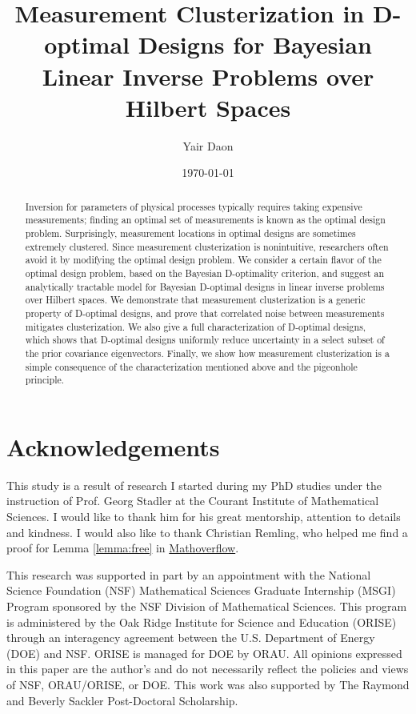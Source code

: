\documentclass{amsart}
\title[Measurement Clusterization in D-optimal Designs]{Measurement
  Clusterization in D-optimal Designs for Bayesian Linear Inverse
  Problems over Hilbert Spaces}
\author{Yair Daon}
\date{\today}
\begin{document}
\begin{abstract}
  Inversion for parameters of physical processes typically requires
  taking expensive measurements; finding an optimal set of
  measurements is known as the optimal design problem. Surprisingly,
  measurement locations in optimal designs are sometimes extremely
  clustered. Since measurement clusterization is nonintuitive,
  researchers often avoid it by modifying the optimal design
  problem. We consider a certain flavor of the optimal design problem,
  based on the Bayesian D-optimality criterion, and suggest an
  analytically tractable model for Bayesian D-optimal designs in
  linear inverse problems over Hilbert spaces. We demonstrate that
  measurement clusterization is a generic property of D-optimal
  designs, and prove that correlated noise between measurements
  mitigates clusterization. We also give a full characterization of
  D-optimal designs, which shows that D-optimal designs uniformly
  reduce uncertainty in a select subset of the prior covariance
  eigenvectors. Finally, we show how measurement clusterization is a
  simple consequence of the characterization mentioned above and the
  pigeonhole principle.
\end{abstract}
\maketitle










\section{Acknowledgements}
This study is a result of research I started during my PhD studies
under the instruction of Prof. Georg Stadler at the Courant Institute
of Mathematical Sciences. I would like to thank him for his great
mentorship, attention to details and kindness. I would also like to
thank Christian Remling, who helped me find a proof for Lemma
\ref{lemma:free} in
\href{https://mathoverflow.net/questions/280168/redistribute-diagonal-entries-of-a-matrix/280203#280203c}{Mathoverflow}.

This research was supported in part by an appointment with the
National Science Foundation (NSF) Mathematical Sciences Graduate
Internship (MSGI) Program sponsored by the NSF Division of
Mathematical Sciences. This program is administered by the Oak Ridge
Institute for Science and Education (ORISE) through an interagency
agreement between the U.S. Department of Energy (DOE) and NSF. ORISE
is managed for DOE by ORAU. All opinions expressed in this paper are
the author's and do not necessarily reflect the policies and views of
NSF, ORAU/ORISE, or DOE. This work was also supported by The Raymond
and Beverly Sackler Post-Doctoral Scholarship.



%


\end{document}
